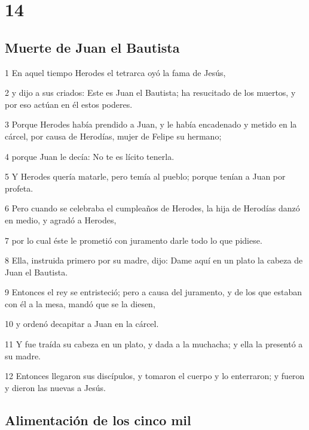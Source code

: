 \chapter{14}

\section*{Muerte de Juan el Bautista}

\par 1 En aquel tiempo Herodes el tetrarca oyó la fama de Jesús,
\par 2 y dijo a sus criados: Este es Juan el Bautista; ha resucitado de los muertos, y por eso actúan en él estos poderes.
\par 3 Porque Herodes había prendido a Juan, y le había encadenado y metido en la cárcel, por causa de Herodías, mujer de Felipe su hermano;
\par 4 porque Juan le decía: No te es lícito tenerla.
\par 5 Y Herodes quería matarle, pero temía al pueblo; porque tenían a Juan por profeta.
\par 6 Pero cuando se celebraba el cumpleaños de Herodes, la hija de Herodías danzó en medio, y agradó a Herodes,
\par 7 por lo cual éste le prometió con juramento darle todo lo que pidiese.
\par 8 Ella, instruida primero por su madre, dijo: Dame aquí en un plato la cabeza de Juan el Bautista.
\par 9 Entonces el rey se entristeció; pero a causa del juramento, y de los que estaban con él a la mesa, mandó que se la diesen,
\par 10 y ordenó decapitar a Juan en la cárcel.
\par 11 Y fue traída su cabeza en un plato, y dada a la muchacha; y ella la presentó a su madre.
\par 12 Entonces llegaron sus discípulos, y tomaron el cuerpo y lo enterraron; y fueron y dieron las nuevas a Jesús.

\section*{Alimentación de los cinco mil}

